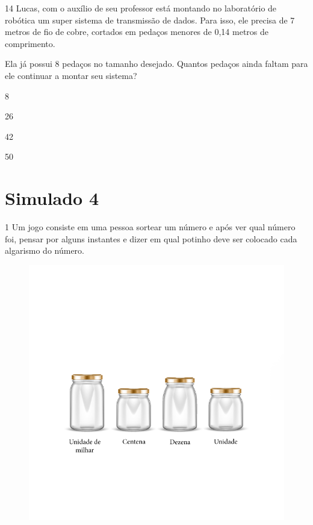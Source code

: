\num{14} Lucas, com o auxílio de seu professor está montando no laboratório
de robótica um super sistema de transmissão de dados. Para isso, ele
precisa de 7 metros de fio de cobre, cortados em pedaços menores de 0,14
metros de comprimento.

Ela já possui 8 pedaços no tamanho desejado. Quantos pedaços ainda
faltam para ele continuar a montar seu sistema?

\begin{escolha}
\item
  8
\item
  26
\item
  42
\item
  50
\end{escolha}


\chapter{Simulado 4}

\num{1} Um jogo consiste em uma pessoa sortear um número e após ver qual
número foi, pensar por alguns instantes e dizer em qual potinho deve ser
colocado cada algarismo do número.

\begin{figure}[htpb!]
\includegraphics[width=\textwidth]{../ilustracoes/MAT5/SAEB_5ANO_MAT_figura123.png}
\end{figure}

